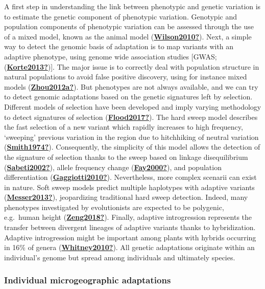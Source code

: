 \documentclass[12pt,twoside,a4paper, a]{article}
\begin{document}
A first step in understanding the link between phenotypic and genetic variation is to estimate the genetic component of phenotypic variation.
Genotypic and population components of phenotypic variation can be assessed through the use of a mixed model, known as the animal model (\protect\hyperlink{ref-Wilson2010}{\textbf{Wilson2010?}}).
Next, a simple way to detect the genomic basis of adaptation is to map variants with an adaptive phenotype, using genome wide association studies {[}GWAS; (\protect\hyperlink{ref-Korte2013}{\textbf{Korte2013?}}){]}.
The major issue is to correctly deal with population structure in natural populations to avoid false positive discovery,
using for instance mixed models (\protect\hyperlink{ref-Zhou2012a}{\textbf{Zhou2012a?}}).
But phenotypes are not always available, and we can try to detect genomic adaptations based on the genetic signatures left by selection.
Different models of selection have been developed and imply varying methodology to detect signatures of selection (\protect\hyperlink{ref-Flood2017}{\textbf{Flood2017?}}).
The hard sweep model describes the fast selection of a new variant which rapidly increases to high frequency,
`sweeping' previous variation in the region due to hitchhiking of neutral variation (\protect\hyperlink{ref-Smith1974}{\textbf{Smith1974?}}).
Consequently, the simplicity of this model allows the detection of the signature of selection thanks to the sweep based on linkage disequilibrium (\protect\hyperlink{ref-Sabeti2002}{\textbf{Sabeti2002?}}), allele frequency change (\protect\hyperlink{ref-Fay2000}{\textbf{Fay2000?}}), and population differentiation (\protect\hyperlink{ref-Gaggiotti2010}{\textbf{Gaggiotti2010?}}).
Nevertheless, more complex scenarii can exist in nature.
Soft sweep models predict multiple haplotypes with adaptive variants (\protect\hyperlink{ref-Messer2013}{\textbf{Messer2013?}}), jeopardizing traditional hard sweep detection.
Indeed, many phenotypes investigated by evolutionists are expected to be polygenic, e.g.~human height (\protect\hyperlink{ref-Zeng2018}{\textbf{Zeng2018?}}).
Finally, adaptive introgression represents the transfer between divergent lineages of adaptive variants thanks to hybridization.
Adaptive introgression might be important among plants with hybrids occurring in 16\% of genera (\protect\hyperlink{ref-Whitney2010}{\textbf{Whitney2010?}}).
All genetic adaptations originate within an individual's genome but spread among individuals and ultimately species.

\hypertarget{individual-microgeographic-adaptations}{%
\subsubsection{Individual microgeographic adaptations}\label{individual-microgeographic-adaptations}}
\end{document}
